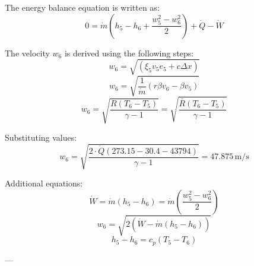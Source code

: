 The energy balance equation is written as:  
\[
0 = \dot{m} \left( h_5 - h_6 + \frac{w_5^2 - w_6^2}{2} \right) + \dot{Q} - \dot{W}
\]  

The velocity \( w_6 \) is derived using the following steps:  
\[
w_6 = \sqrt{\left( \xi_5 v_5 e_5 + c \Delta x \right)}  
\]  
\[
w_6 = \sqrt{\frac{1}{\dot{m}} \left( r \beta v_6 - \beta v_5 \right)}  
\]  
\[
w_6 = \sqrt{\frac{R \left( T_6 - T_5 \right)}{\gamma - 1}} = \sqrt{\frac{\bar{R} \left( T_6 - T_5 \right)}{\gamma - 1}}
\]  

Substituting values:  
\[
w_6 = \sqrt{\frac{2 \cdot \dot{Q} \left( 273.15 - 30.4 - 43794 \right)}{\gamma - 1}} = 47.875 \, \text{m/s}
\]  

Additional equations:  
\[
\dot{W} = \dot{m} \left( h_5 - h_6 \right) = \dot{m} \left( \frac{w_5^2 - w_6^2}{2} \right)
\]  
\[
w_6 = \sqrt{2 \left( \dot{W} - \dot{m} \left( h_5 - h_6 \right) \right)}
\]  
\[
h_5 - h_6 = c_p \left( T_5 - T_6 \right)
\]  

---